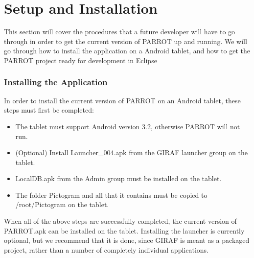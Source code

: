 \chapter{Setup and Installation}
\label{setup}
This section will cover the procedures that a future developer will have to go through in order to get the current version of PARROT up and running.
We will go through how to install the application on a Android tablet, and how to get the PARROT project ready for development in Eclipse\newline

\subsection{Installing the Application}
In order to install the current version of PARROT on an Android tablet, these steps must first be completed:
\begin{itemize}
	\item The tablet must support Android version 3.2, otherwise PARROT will not run.
	\item (Optional) Install Launcher\_004.apk from the GIRAF launcher group on the tablet.
	\item LocalDB.apk from the Admin group must be installed on the tablet.
	\item The folder Pictogram and all that it contains must be copied to /root/Pictogram on the tablet.
\end{itemize}
When all of the above steps are successfully completed, the current version of PARROT.apk can be installed on the tablet.
Installing the launcher is currently optional, but we recommend that it is done, since GIRAF is meant as a packaged project, rather than a number of completely individual applications.

